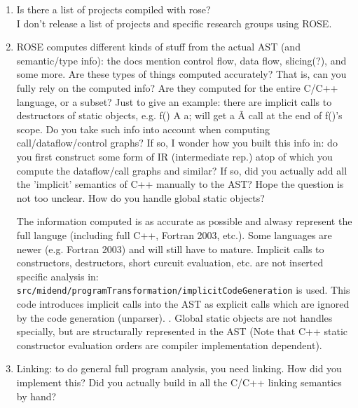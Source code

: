 \begin{enumerate}
\item Is there a list of projects compiled with rose? \\
     I don't release a list of projects and specific research groups using ROSE.  

\item ROSE computes different kinds of stuff from the actual AST (and semantic/type info): 
      the docs mention control flow, data flow, slicing(?), and some more.
      Are these types of things computed accurately? That is, can you fully rely on the computed info?
      Are they computed for the entire C/C++ language, or a subset? Just to give an
      example: there are implicit calls to destructors of static objects, e.g. f() { A a; }
      will get a \~A call at the end of f()'s scope. Do you take such info into account when
      computing call/dataflow/control graphs? If so, I wonder how you built this info in: do
      you first construct some form of IR (intermediate rep.) atop of which you compute the
      dataflow/call graphs and similar? If so, did you actually add all the 'implicit'
      semantics of C++ manually to the AST? Hope the question is not too unclear.
      How do you handle global static objects?

   The information computed is as accurate as possible and alwasy represent the full
   languge (including full C++, Fortran 2003, etc.).  Some languages are newer
   (e.g. Fortran 2003) and will still have to mature.  Implicit calls to
   constructors, destructors, short curcuit evaluation, etc. are not inserted specific analysis in:
   {\tt src/midend/programTransformation/implicitCodeGeneration} is used. This code introduces
   implicit calls into the AST as explicit calls which are ignored by the code generation
   (unparser). .
   Global static objects are not handles specially, but are structurally represented in
   the AST (Note that C++ static constructor evaluation orders are compiler implementation dependent).

\item Linking: to do general full program analysis, you need linking. How did you
    implement this? Did you actually build in all the C/C++ linking semantics by hand?


\end{enumerate}
